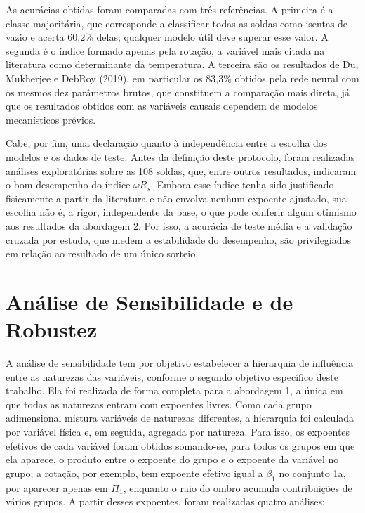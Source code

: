 \documentclass[12pt,openany]{report}
\begin{document}
As acurácias obtidas foram comparadas com três referências. A primeira é a classe majoritária, que corresponde a classificar todas as soldas como isentas de vazio e acerta 60,2\% delas; qualquer modelo útil deve superar esse valor. A segunda é o índice formado apenas pela rotação, a variável mais citada na literatura como determinante da temperatura. A terceira são os resultados de Du, Mukherjee e DebRoy (2019), em particular os 83,3\% obtidos pela rede neural com os mesmos dez parâmetros brutos, que constituem a comparação mais direta, já que os resultados obtidos com as variáveis causais dependem de modelos mecanísticos prévios.

Cabe, por fim, uma declaração quanto à independência entre a escolha dos modelos e os dados de teste. Antes da definição deste protocolo, foram realizadas análises exploratórias sobre as 108 soldas, que, entre outros resultados, indicaram o bom desempenho do índice $\omega R_s$. Embora esse índice tenha sido justificado fisicamente a partir da literatura e não envolva nenhum expoente ajustado, sua escolha não é, a rigor, independente da base, o que pode conferir algum otimismo aos resultados da abordagem 2. Por isso, a acurácia de teste média e a validação cruzada por estudo, que medem a estabilidade do desempenho, são privilegiados em relação ao resultado de um único sorteio.

\section{Análise de Sensibilidade e de Robustez}
\label{sec:sensibilidade}

A análise de sensibilidade tem por objetivo estabelecer a hierarquia de influência entre as naturezas das variáveis, conforme o segundo objetivo específico deste trabalho. Ela foi realizada de forma completa para a abordagem 1, a única em que todas as naturezas entram com expoentes livres. Como cada grupo adimensional mistura variáveis de naturezas diferentes, a hierarquia foi calculada por variável física e, em seguida, agregada por natureza. Para isso, os expoentes efetivos de cada variável foram obtidos somando-se, para todos os grupos em que ela aparece, o produto entre o expoente do grupo e o expoente da variável no grupo; a rotação, por exemplo, tem expoente efetivo igual a $\beta_1$ no conjunto 1a, por aparecer apenas em $\Pi_1$, enquanto o raio do ombro acumula contribuições de vários grupos. A partir desses expoentes, foram realizadas quatro análises:
\end{document}
